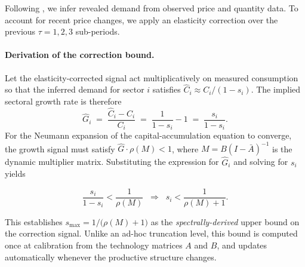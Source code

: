 Following \citet{samuelson1948consumption}, we infer revealed demand
from observed price and quantity data.
To account for recent price changes, we apply an elasticity correction
over the previous $\tau = 1,2,3$ sub-periods.

\paragraph{Derivation of the correction bound.}
Let the elasticity-corrected signal act multiplicatively on measured
consumption so that the inferred demand for sector $i$ satisfies
$\hat{C}_i \approx C_i / (1 - s_i)$.
The implied sectoral growth rate is therefore
%
\begin{equation}
    \hat{G}_i
    \;=\; \frac{\hat{C}_i - C_i}{C_i}
    \;=\; \frac{1}{1 - s_i} - 1
    \;=\; \frac{s_i}{1 - s_i}.
\end{equation}
%
For the Neumann expansion of the capital-accumulation equation to converge, the growth signal must satisfy
$\hat{G}\cdot\rho(M) < 1$, where $M = B(I-\bar{A})^{-1}$ is the
dynamic multiplier matrix.
Substituting the expression for $\hat{G}_i$ and solving for $s_i$
yields

\begin{equation}
    \frac{s_i}{1-s_i} < \frac{1}{\rho(M)}
    \;\;\Longrightarrow\;\;
    s_i < \frac{1}{\rho(M)+1}.
\end{equation}

This establishes $s_{\max} = 1/\bigl(\rho(M)+1\bigr)$ as the
\emph{spectrally-derived} upper bound on the correction signal.
Unlike an ad-hoc truncation level, this bound is computed once at
calibration from the technology matrices $A$ and $B$, and updates
automatically whenever the productive structure changes.

